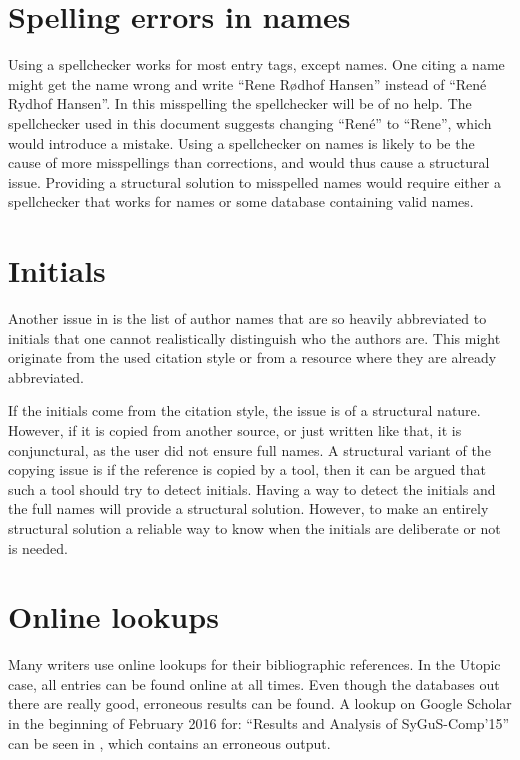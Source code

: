 \section{Spelling errors in names}
\label{sec:problems_spelling_names}

Using a spellchecker works for most entry tags, except names.  One
citing a name might get the name wrong and write ``Rene Rødhof
Hansen'' instead of ``René Rydhof Hansen''.  In this misspelling the
spellchecker will be of no help.  The spellchecker used in this
document suggests changing ``René'' to ``Rene'', which would introduce
a mistake.  Using a spellchecker on names is likely to be the cause
of more misspellings than corrections, and would thus cause a
structural issue.  Providing a structural solution to misspelled names
would require either a spellchecker that works for names or some
database containing valid names.


\section{Initials}
\label{sec:problems_initials}

Another issue in  is the list of author
names that are so heavily abbreviated to initials that one cannot
realistically distinguish who the authors are.  This might originate
from the used citation style or from a resource where they are already
abbreviated.

If the initials come from the citation style, the issue is of a
structural nature.  However, if it is copied from another source, or
just written like that, it is conjunctural, as the user did not ensure
full names.  A structural variant of the copying issue is if the
reference is copied by a tool, then it can be argued that such a tool
should try to detect initials.  Having a way to detect the initials
and the full names will provide a structural solution.  However, to
make an entirely structural solution a reliable way to know when the
initials are deliberate or not is needed.


\section{Online lookups}
\label{sec:problems_look_ups}

Many writers use online lookups for their bibliographic references.
In the Utopic case, all entries can be found online at all times.
Even though the databases out there are really good, erroneous results
can be found.  A lookup on Google Scholar in the beginning of February
2016 for: ``Results and Analysis of SyGuS-Comp’15'' can be seen in
, which contains an erroneous output.

